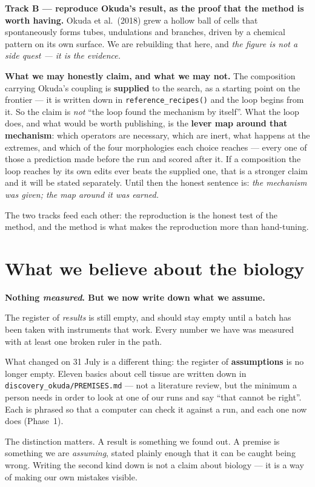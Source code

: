 \documentclass[11pt,a4paper]{article}
\newcommand{\code}[1]{\texttt{#1}}
\begin{document}
\textbf{Track B --- reproduce Okuda's result, as the proof that the method is worth having.} Okuda
et al.\ (2018) grew a hollow ball of cells that spontaneously forms tubes, undulations and branches,
driven by a chemical pattern on its own surface. We are rebuilding that here, and \emph{the figure
is not a side quest --- it is the evidence.}

\textbf{What we may honestly claim, and what we may not.} The composition carrying Okuda's coupling
is \textbf{supplied} to the search, as a starting point on the frontier --- it is written down in
\code{reference\_recipes()} and the loop begins from it. So the claim is \emph{not} ``the loop found
the mechanism by itself''. What the loop does, and what would be worth publishing, is the
\textbf{lever map around that mechanism}: which operators are necessary, which are inert, what
happens at the extremes, and which of the four morphologies each choice reaches --- every one of
those a prediction made before the run and scored after it. If a composition the loop reaches by
its own edits ever beats the supplied one, that is a stronger claim and it will be stated
separately. Until then the honest sentence is: \emph{the mechanism was given; the map around it was
earned.}

The two tracks feed each other: the reproduction is the honest test of the method, and the method
is what makes the reproduction more than hand-tuning.

\section{What we believe about the biology}

\begin{tcolorbox}[colback=grey!6,colframe=grey!45,boxrule=0.7pt,arc=2pt]
\begin{center}\large\textbf{Nothing \emph{measured}. But we now write down what we assume.}\end{center}

The register of \emph{results} is still empty, and should stay empty until a batch has been taken
with instruments that work. Every number we have was measured with at least one broken ruler in the
path.

What changed on 31 July is a different thing: the register of \textbf{assumptions} is no longer
empty. Eleven basics about cell tissue are written down in \texttt{discovery\_okuda/PREMISES.md} --- not a
literature review, but the minimum a person needs in order to look at one of our runs and say
``that cannot be right''. Each is phrased so that a computer can check it against a run, and each
one now does (Phase~1).

The distinction matters. A result is something we found out. A premise is something we are
\emph{assuming}, stated plainly enough that it can be caught being wrong. Writing the second kind
down is not a claim about biology --- it is a way of making our own mistakes visible.
\end{tcolorbox}
\end{document}
